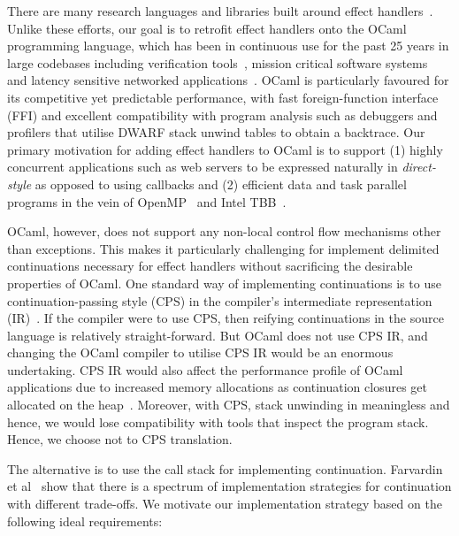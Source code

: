 \documentclass[sigplan,10pt,review,anonymous]{acmart}\settopmatter{printfolios=true,printccs=false,printacmref=false}
\begin{document}
There are many research languages and libraries built around effect
handlers~\cite{Koka,Links,Pyro,Frank,Eff}. Unlike these efforts, our goal is to
retrofit effect handlers onto the OCaml programming language, which has been in
continuous use for the past 25 years in large codebases including verification
tools~\cite{FStar,Coq}, mission critical software systems~\cite{astree} and
latency sensitive networked applications~\cite{JS,Docker,MirageOS}. OCaml is
particularly favoured for its competitive yet predictable performance, with
fast foreign-function interface (FFI) and excellent compatibility with program
analysis such as debuggers and profilers that utilise DWARF stack unwind tables
to obtain a backtrace. Our primary motivation for adding effect handlers to
OCaml is to support (1) highly concurrent applications such as web servers to
be expressed naturally in \emph{direct-style} as opposed to using callbacks and
(2) efficient data and task parallel programs in the vein of OpenMP~\cite{} and
Intel TBB~\cite{}.

OCaml, however, does not support any non-local control flow mechanisms other
than exceptions. This makes it particularly challenging for implement delimited
continuations necessary for effect handlers without sacrificing the desirable
properties of OCaml. One standard way of implementing continuations is to use
continuation-passing style (CPS) in the compiler's intermediate representation
(IR)~\cite{Koka}. If the compiler were to use CPS, then reifying continuations
in the source language is relatively straight-forward. But OCaml does not use
CPS IR, and changing the OCaml compiler to utilise CPS IR would be an enormous
undertaking. CPS IR would also affect the performance profile of OCaml
applications due to increased memory allocations as continuation closures get
allocated on the heap~\cite{Folklore}. Moreover, with CPS, stack unwinding in
meaningless and hence, we would lose compatibility with tools that inspect the
program stack. Hence, we choose not to CPS translation.

The alternative is to use the call stack for implementing continuation.
Farvardin et al~\cite{Folklore} show that there is a spectrum of implementation
strategies for continuation with different trade-offs. We motivate our
implementation strategy based on the following ideal requirements:
\end{document}
